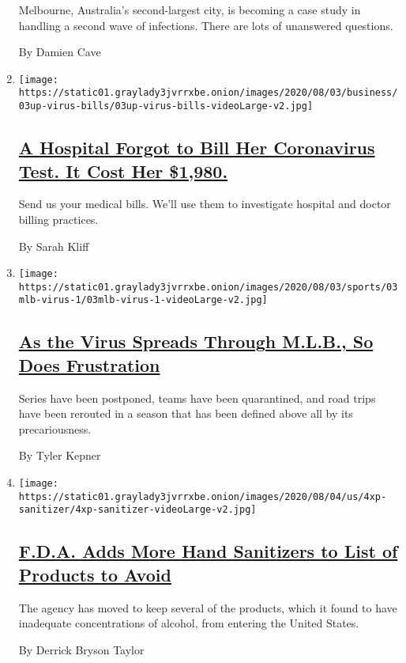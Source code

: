\begin{enumerate}
  Melbourne, Australia's second-largest city, is becoming a case study
  in handling a second wave of infections. There are lots of unanswered
  questions.

  By Damien Cave
\item
  \texttt{[image: https://static01.graylady3jvrrxbe.onion/images/2020/08/03/business/03up-virus-bills/03up-virus-bills-videoLarge-v2.jpg]}

  \hypertarget{a-hospital-forgot-to-bill-her-coronavirus-test-it-cost-her-1980}{%
  \subsection{\texorpdfstring{\href{/2020/08/03/upshot/nj-coronavirus-medical-bill.html}{A
  Hospital Forgot to Bill Her Coronavirus Test. It Cost Her
  \$1,980.}}{A Hospital Forgot to Bill Her Coronavirus Test. It Cost Her \$1,980.}}\label{a-hospital-forgot-to-bill-her-coronavirus-test-it-cost-her-1980}}

  Send us your medical bills. We'll use them to investigate hospital and
  doctor billing practices.

  By Sarah Kliff
\item
  \texttt{[image: https://static01.graylady3jvrrxbe.onion/images/2020/08/03/sports/03mlb-virus-1/03mlb-virus-1-videoLarge-v2.jpg]}

  \hypertarget{as-the-virus-spreads-through-mlb-so-does-frustration}{%
  \subsection{\texorpdfstring{\href{/2020/08/03/sports/baseball/mlb-coronavirus-outbreak.html}{As
  the Virus Spreads Through M.L.B., So Does
  Frustration}}{As the Virus Spreads Through M.L.B., So Does Frustration}}\label{as-the-virus-spreads-through-mlb-so-does-frustration}}

  Series have been postponed, teams have been quarantined, and road
  trips have been rerouted in a season that has been defined above all
  by its precariousness.

  By Tyler Kepner
\item
  \texttt{[image: https://static01.graylady3jvrrxbe.onion/images/2020/08/04/us/4xp-sanitizer/4xp-sanitizer-videoLarge-v2.jpg]}

  \hypertarget{fda-adds-more-hand-sanitizers-to-list-of-products-to-avoid}{%
  \subsection{\texorpdfstring{\href{/2020/08/04/health/fda-hand-sanitizer-recall.html}{F.D.A.
  Adds More Hand Sanitizers to List of Products to
  Avoid}}{F.D.A. Adds More Hand Sanitizers to List of Products to Avoid}}\label{fda-adds-more-hand-sanitizers-to-list-of-products-to-avoid}}

  The agency has moved to keep several of the products, which it found
  to have inadequate concentrations of alcohol, from entering the United
  States.

  By Derrick Bryson Taylor
\end{enumerate}

